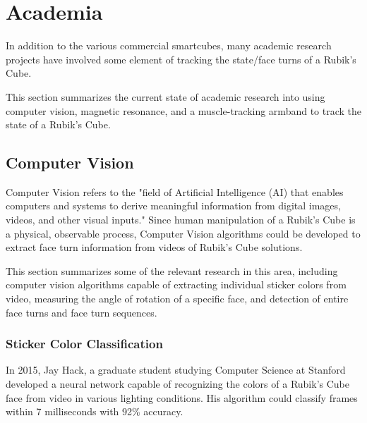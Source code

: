 \section{Academia}
\label{sec:academia}
In addition to the various commercial smartcubes, many academic research projects have involved some element of tracking the state/face turns of a Rubik's Cube.

This section summarizes the current state of academic research into using computer vision, magnetic resonance, and a muscle-tracking armband to track the state of a Rubik's Cube.

\subsection{Computer Vision}
\label{subsec:computer-vision}
Computer Vision refers to the "field of Artificial Intelligence (AI) that enables computers and systems to derive meaningful information from digital images, videos, and other visual inputs." \cite{ibm-cv-definition}
Since human manipulation of a Rubik's Cube is a physical, observable process, Computer Vision algorithms could be developed to extract face turn information from videos of Rubik's Cube solutions.

This section summarizes some of the relevant research in this area, including computer vision algorithms capable of extracting individual sticker colors from video, measuring the angle of rotation of a specific face, and detection of entire face turns and face turn sequences.

\subsubsection{Sticker Color Classification}
In 2015, Jay Hack, a graduate student studying Computer Science at Stanford developed a neural network capable of recognizing the colors of a Rubik's Cube face from video in various lighting conditions.
His algorithm could classify frames within 7 milliseconds with 92\% accuracy. \cite{hackrubik}

